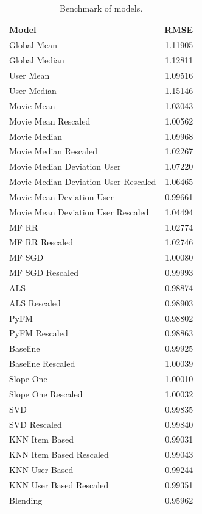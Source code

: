\documentclass[10pt,conference,compsocconf]{IEEEtran}
\begin{document}
\begin{table}[htbp]
\centering
\begin{tabular}[c]{| l r |}
\hline
Model & RMSE \\
\hline 
\hline
Global Mean                  	           			& 1.11905\\
Global Median                          			 	& 1.12811\\
User Mean                               				& 1.09516\\
User Median                             				& 1.15146\\
Movie Mean                              				& 1.03043\\
Movie Mean Rescaled                    			& 1.00562\\
Movie Median                            				& 1.09968\\
Movie Median Rescaled                  			& 1.02267\\
Movie Median Deviation User           			& 1.07220\\
Movie Median Deviation User Rescaled 		& 1.06465\\
Movie Mean Deviation User             			& 0.99661 \\
Movie Mean Deviation User Rescaled   		& 1.04494\\
MF RR                                   				& 1.02774\\
MF RR Rescaled                         			& 1.02746\\
MF SGD                                  				& 1.00080\\
MF SGD Rescaled                       			& 0.99993 \\
ALS                                      				& 0.98874\\
ALS Rescaled                           				& 0.98903 \\
PyFM                                     				& 0.98802 \\
PyFM Rescaled                           			& 0.98863 \\
Baseline                                 				& 0.99925 \\
Baseline Rescaled                       			& 1.00039\\
Slope One                               				& 1.00010\\
Slope One Rescaled                     			& 1.00032\\
SVD                                      				& 0.99835\\
SVD Rescaled                            			& 0.99840 \\
KNN Item Based                                  		& 0.99031 \\
KNN Item Based Rescaled                        		& 0.99043\\
KNN User Based                                  		& 0.99244 \\
KNN User Based Rescaled                       		& 0.99351 \\
 \hline \hline
Blending			&  0.95962 \\ 
\hline
\end{tabular}
  \caption{Benchmark of models.}
  \label{benchmark}
\end{table}
\end{document}
